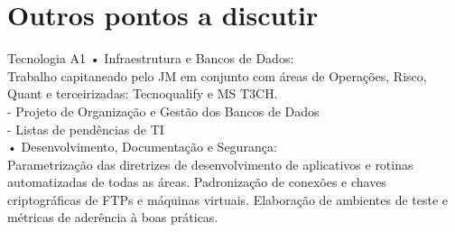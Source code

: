 \documentclass[t,aspectratio=169]{beamer}
\begin{document}
\section[Outros]{Outros pontos a discutir}
\begin{frame}{Tecnologia A1}
	• {\color{blue1} Infraestrutura e Bancos de Dados:}\\
	Trabalho capitaneado pelo JM em conjunto com áreas de Operações, Risco, Quant e terceirizadas: Tecnoqualify e MS T3CH.\\
	- Projeto de Organização e Gestão dos Bancos de Dados\\
	- Listas de pendências de TI\\
 	• {\color{blue1} Desenvolvimento, Documentação e Segurança:}\\
	Parametrização das diretrizes de desenvolvimento de aplicativos e rotinas automatizadas de todas as áreas. Padronização de conexões e chaves criptográficas de FTPs e máquinas virtuais. Elaboração de ambientes de teste e métricas de aderência à boas práticas.
\end{frame}
\end{document}
